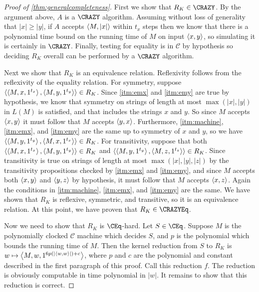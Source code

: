 \begin{proof}[Proof of \autoref{thm:generalcompleteness}]
  First we show that $R_K\in\CRAZY$.
  By the argument above, $A$ is a $\CRAZY$ algorithm.
  Assuming without loss of generality that $|x|\geq |y|$, if $A$ accepts $\left\langle M,|x|\right\rangle$ within $t_x$ steps then we know that there is a polynomial time bound on the running time of $M$ on input $\left\langle x,y\right\rangle$, so simulating it is certainly in $\CRAZY$.
  Finally, testing for equality is in $\mathcal{C}$ by hypothesis so deciding $R_K$ overall can be performed by a $\CRAZY$ algorithm.

  Next we show that $R_K$ is an equivalence relation.
  Reflexivity follows from the reflexivity of the equality relation.
  For symmetry, suppose $\left\langle\left\langle M,x,1^{t_x}\right\rangle,\left\langle M,y,1^{t_y}\right\rangle\right\rangle\in R_K$.
  Since \autoref{itm:emx} and \autoref{itm:emy} are true by hypothesis, we know that symmetry on strings of length at most $\max(|x|, |y|)$ in $L(M)$ is satisfied, and that includes the strings $x$ and $y$.
  So since $M$ accepts $\left\langle x,y\right\rangle$ it must follow that $M$ accepts $\left\langle y,x\right\rangle$.
  Furthermore, \autoref{itm:machine}, \autoref{itm:emx}, and \autoref{itm:emy} are the same up to symmetry of $x$ and $y$, so we have $\left\langle\left\langle M,y,1^{t_y}\right\rangle,\left\langle M,x,1^{t_x}\right\rangle\right\rangle\in R_K$.
  For transitivity, suppose that both $\left\langle\left\langle M,x,1^{t_x}\right\rangle,\left\langle M,y,1^{t_y}\right\rangle\right\rangle\in R_K$ and $\left\langle\left\langle M,y,1^{t_y}\right\rangle,\left\langle M,z,1^{t_z}\right\rangle\right\rangle\in R_K$.
  Since transitivity is true on strings of length at most $\max(|x|, |y|, |z|)$ by the transitivity propositions checked by \autoref{itm:emx} and \autoref{itm:emy}, and since $M$ accepts both $\left\langle x,y\right\rangle$ and $\left\langle y,z\right\rangle$ by hypothesis, it must follow that $M$ accepts $\left\langle x,z\right\rangle$.
  Again the conditions in \autoref{itm:machine}, \autoref{itm:emx}, and \autoref{itm:emy} are the same.
  We have shown that $R_K$ is reflexive, symmetric, and transitive, so it is an equivalence relation.
  At this point, we have proven that $R_K\in\CRAZYEq$.

  Now we need to show that $R_K$ is $\CEq$-hard.
  Let $S\in\CEq$.
  Suppose $M$ is the polynomially clocked $\mathcal{C}$ machine which decides $S$, and $p$ is the polynomial which bounds the running time of $M$.
  Then the kernel reduction from $S$ to $R_K$ is $w\mapsto\left\langle M,w,1^{6p(|\left\langle w,w\right\rangle|)+c}\right\rangle$, where $p$ and $c$ are the polynomial and constant described in the first paragraph of this proof.
  Call this reduction $f$.
  The reduction is obviously computable in time polynomial in $|w|$.
  It remains to show that this reduction is correct.


\end{proof}
